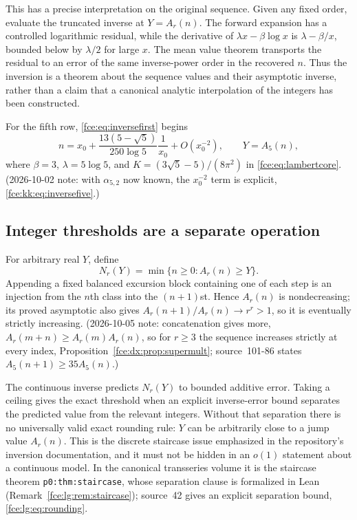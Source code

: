 \documentclass[11pt,a4paper]{article}
\numberwithin{equation}{section}
\theoremstyle{definition}\newtheorem{definition}[theorem]{Definition}
\theoremstyle{remark}\newtheorem{remark}[theorem]{Remark}
\begin{document}
This has a precise interpretation on the original sequence. Given any
fixed order, evaluate the truncated inverse at $Y=A_r(n)$. The forward
expansion has a controlled logarithmic residual, while the derivative of
$\lambda x-\beta\log x$ is $\lambda-\beta/x$, bounded below by
$\lambda/2$ for large $x$. The mean value theorem transports the residual
to an error of the same inverse-power order in the recovered $n$.
Thus the inversion is a theorem about the sequence values and their
asymptotic inverse, rather than a claim that a canonical analytic
interpolation of the integers has been constructed.

For the fifth row, \eqref{fce:eq:inversefirst} begins
\begin{equation}\label{fce:eq:inversefive}
 n=x_0+\frac{13(5-\sqrt5)}{250\log5}\frac1{x_0}
                  +O(x_0^{-2}),\qquad Y=A_5(n),
\end{equation}
where $\beta=3$, $\lambda=5\log5$, and
$K=(3\sqrt5-5)/(8\pi^2)$ in \eqref{fce:eq:lambertcore}. (2026-10-02 note:
with $\alpha_{5,2}$ now known, the $x_0^{-2}$ term is explicit,
\eqref{fce:kk:eq:inversefive}.)

\subsection{Integer thresholds are a separate operation}\label{fce:sec:thresholds}
For arbitrary real $Y$, define
\[
 N_r(Y)=\min\{n\ge0:A_r(n)\ge Y\}.
\]
Appending a fixed balanced excursion block containing one of each step
is an injection from the $n$th class into the $(n+1)$st. Hence $A_r(n)$
is nondecreasing; its proved asymptotic also gives
$A_r(n+1)/A_r(n)\to r^r>1$, so it is eventually strictly increasing.
(2026-10-05 note: concatenation gives more, $A_r(m+n)\ge A_r(m)A_r(n)$, so for
$r\ge3$ the sequence increases strictly at every index,
Proposition~\ref{fce:dx:prop:supermult}; source~101-86 states
$A_5(n+1)\ge35A_5(n)$.)

The continuous inverse predicts $N_r(Y)$ to bounded additive error.
Taking a ceiling gives the exact threshold when an explicit inverse-error
bound separates the predicted value from the relevant integers. Without
that separation there is no universally valid exact rounding rule: $Y$
can be arbitrarily close to a jump value $A_r(n)$. This is the discrete
staircase issue emphasized in the repository's inversion documentation,
and it must not be hidden in an $o(1)$ statement about a continuous model.
In the canonical transseries volume it is the staircase theorem
\texttt{p0:thm:staircase}, whose separation clause is formalized in Lean
(Remark~\ref{fce:lg:rem:staircase}); source~42 gives an explicit
separation bound, \eqref{fce:lg:eq:rounding}.
\end{document}
